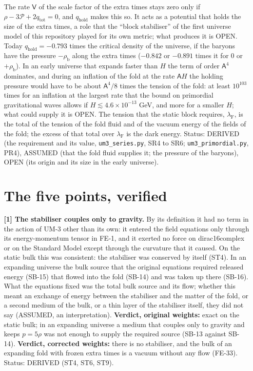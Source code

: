 \documentclass[
  10pt,
]{article}
\begin{document}
The rate \(\mathsf{V}\) of the scale factor of the extra times stays
zero only if \(\rho - 3\mathcal{P} + 2q_{\mathrm{tot}} = 0\), and
\(q_{\mathrm{hold}}\) makes this so. It acts as a potential that holds
the size of the extra times, a role that the ``block stabiliser'' of the
first universe model of this repository played for its own metric; what
produces it is OPEN. Today \(q_{\mathrm{hold}} = -0.793\) times the
critical density of the universe, if the baryons have the pressure
\(-\rho_{\mathrm{b}}\) along the extra times (\(-0.842\) or \(-0.891\)
times it for 0 or \(+\rho_{\mathrm{b}}\)). In an early universe that
expands faster than \(H\) the term of order \(\mathsf{A}^4\) dominates,
and during an inflation of the fold at the rate \(\mathsf{A}H\) the
holding pressure would have to be about \(\mathsf{A}^4/8\) times the
tension of the fold: at least \(10^{103}\) times for an inflation at the
largest rate that the bound on primordial gravitational waves allows if
\(H \lesssim 4.6\times10^{-13}\) GeV, and more for a smaller \(H\); what
could supply it is OPEN. The tension that the static block requires,
\(\lambda_{\mathrm{F}}\), is the total of the tension of the fold fluid
and of the vacuum energy of the fields of the fold; the excess of that
total over \(\lambda_{\mathrm{F}}\) is the dark energy. Status: DERIVED
(the requirement and its value, \texttt{um3\_series.py}, SR4 to SR6;
\texttt{um3\_primordial.py}, PR4), ASSUMED (that the fold fluid supplies
it; the pressure of the baryons), OPEN (its origin and its size in the
early universe).

\hypertarget{the-five-points-verified}{%
\section{The five points, verified}\label{the-five-points-verified}}

\textbf{{[}1{]} The stabiliser couples only to gravity.} By its
definition it had no term in the action of UM-3 other than its own: it
entered the field equations only through its energy-momentum tensor in
FE-1, and it exerted no force on dirac16complex or on the Standard Model
except through the curvature that it caused. On the static bulk this was
consistent: the stabiliser was conserved by itself (ST4). In an
expanding universe the bulk source that the original equations required
released energy (SB-15) that flowed into the fold (SB-14) and was taken
up there (SB-16). What the equations fixed was the total bulk source and
its flow; whether this meant an exchange of energy between the
stabiliser and the matter of the fold, or a second medium of the bulk,
or a thin layer of the stabiliser itself, they did not say (ASSUMED, an
interpretation). \textbf{Verdict, original weights:} exact on the static
bulk; in an expanding universe a medium that couples only to gravity and
keeps \(p = 5\rho\) was not enough to supply the required source (SB-13
against SB-14). \textbf{Verdict, corrected weights:} there is no
stabiliser, and the bulk of an expanding fold with frozen extra times is
a vacuum without any flow (FE-33). Status: DERIVED (ST4, ST6, ST9).
\end{document}
